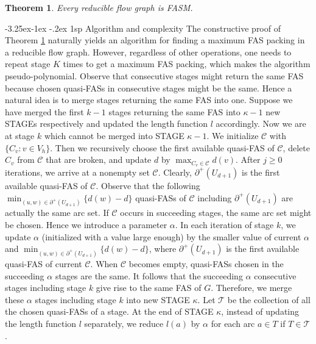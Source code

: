 \documentclass[11pt]{article}
\makeatletter
\newtheorem{theorem}{Theorem}[section]
\renewcommand\subsection{%
  \@startsection{subsection}{2}
                {\z@}%
                {-3.25ex\@plus -1ex \@minus -.2ex}%
                {1sp}%
                {\normalsize\bfseries}%
}
\makeatother
\begin{document}
\begin{theorem}
\label{thm:4}
Every reducible flow graph is FASM.
\end{theorem}

\subsection{Algorithm and complexity}
\label{sec:5}
The constructive proof of Theorem \ref{thm:4} naturally yields an algorithm for finding a maximum FAS packing in a reducible flow graph. However, regardless of other operations, one needs to repeat stage $K$ times to get a maximum FAS packing, which makes the algorithm pseudo-polynomial. Observe that consecutive stages might return the same FAS because chosen quasi-FASs in consecutive stages might be the same. Hence a natural idea is to merge stages returning the same FAS into one.  
Suppose we have merged the first $k-1$ stages returning the same FAS into $\kappa-1$ new STAGEs respectively and updated the length function $l$ accordingly. Now we are at stage $k$ which cannot be merged into STAGE $\kappa-1$. We initialize $\mathcal{C}$ with $\{C_v:v\in V_h\}$. Then we recursively choose the first available quasi-FAS of $\mathcal{C}$, delete $C_v$ from $\mathcal{C}$ that are broken, and update $d$ by $\max_{C_v\in\mathcal{C}} d(v)$. After $j\geq 0$ iterations, we arrive at a nonempty set $\mathcal{C}$. Clearly, $\partial^+(U_{d+1})$ is the first available quasi-FAS of $\mathcal{C}$. Observe that the following $\min_{(u,w)\in\partial^+(U_{d+1})}\{d(w)-d\}$ quasi-FASs of $\mathcal{C}$ including $\partial^+(U_{d+1})$ are actually the same arc set. If $\mathcal{C}$ occurs in succeeding stages, the same arc set might be chosen. Hence we introduce a parameter $\alpha$. In each iteration of stage $k$, we update $\alpha$ (initialized with a value large enough) by the smaller value of current $\alpha$ and $\min_{(u,w)\in\partial^+(U_{d+1})}\{d(w)-d\}$, where $\partial^+(U_{d+1})$ is the first available quasi-FAS of current $\mathcal{C}$. When $\mathcal{C}$ becomes empty, quasi-FASs chosen in the succeeding $\alpha$ stages are the same. It follows that the succeeding $\alpha$ consecutive stages including stage $k$ give rise to the same FAS of $G$. Therefore, we merge these $\alpha$ stages including stage $k$ into new STAGE $\kappa$. Let $\mathcal{T}$ be the collection of all the chosen quasi-FASs of a stage. At the end of STAGE $\kappa$, instead of updating the length function $l$ separately, we reduce $l(a)$ by $\alpha$ for each arc $a\in T$ if $T\in\mathcal{T}$.
\end{document}
